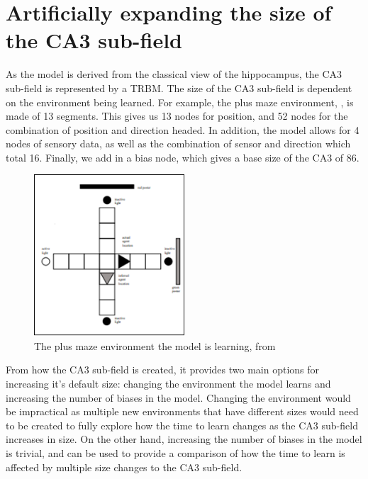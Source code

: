 \section{Artificially expanding the size of the CA3 sub-field }
As the model is derived from the classical view of the hippocampus, the CA3 sub-field is represented by a TRBM.
The size of the CA3 sub-field is dependent on the environment being learned.
For example, the plus maze environment, , is made of 13 segments.
This gives us 13 nodes for position, and 52 nodes for the combination of position and direction headed.
In addition, the model allows for 4 nodes of sensory data, as well as the combination of sensor and direction which total 16.
Finally, we add in a bias node, which gives a base size of the CA3 of 86.


\begin{figure}
    \centering
    \includegraphics[width=0.5\textwidth]{figures/methods_size/plus_maze.png}
    \caption{The plus maze environment the model is learning, from \cite{foxandprescott2010A}}
    \label{fig:plus_maze}
\end{figure}

From how the CA3 sub-field is created, it provides two main options for increasing it's default size:
changing the environment the model learns and increasing the number of biases in the model.
Changing the environment would be impractical as multiple new environments that have different sizes would need to be created to fully explore how the time to learn changes as the CA3 sub-field increases in size.
On the other hand, increasing the number of biases in the model is trivial, and can be used to provide a comparison of how the time to learn is affected by multiple size changes to the CA3 sub-field.



